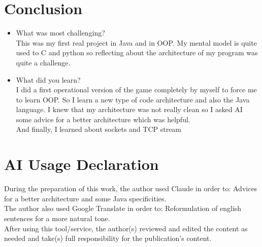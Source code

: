 \documentclass[11pt]{article}
\begin{document}
\section{Conclusion}
\begin{itemize}
    \item What was most challenging?\\
        This was my first real project in Java and in OOP. My mental model is quite used to C and python so reflecting about the architecture of my program was quite a challenge.
    \item What did you learn?\\
        I did a first operational version of the game completely by myself to force me to learn OOP. So I learn a new type of code architecture and also the Java language. I knew that my architecture was not really clean so I asked AI some advice for a better architecture which was helpful.\\
        And finally, I learned about sockets and TCP stream
\end{itemize}

\section{AI Usage Declaration}

During the preparation of this work, the author used Claude in order to: Advices for a better architecture and some Java specificities.\\
The author also used Google Translate in order to: Reformulation of english sentences for a more natural tone.\\
After using this tool/service, the author(s) reviewed and edited the content as needed and take(s) full responsibility for the publication’s content.
\end{document}
